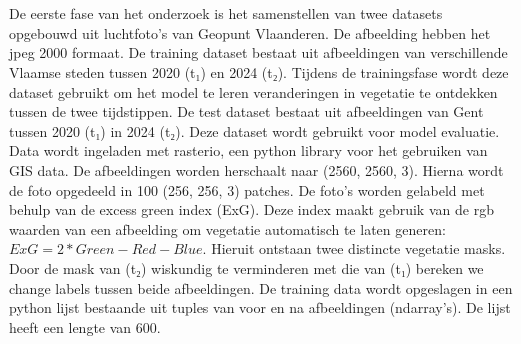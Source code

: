 \section{}%
\label{sec:image-preprocessing}
De eerste fase van het onderzoek is het samenstellen van twee datasets opgebouwd uit luchtfoto's van Geopunt Vlaanderen. De afbeelding hebben
het jpeg 2000 formaat. De training dataset bestaat uit afbeeldingen van verschillende Vlaamse steden tussen 2020 (t₁) en 2024 (t₂). 
Tijdens de trainingsfase wordt deze dataset gebruikt om het model te leren veranderingen in vegetatie te ontdekken tussen de twee tijdstippen.
De test dataset bestaat uit afbeeldingen van Gent tussen 2020 (t₁) in 2024 (t₂). Deze dataset wordt gebruikt voor model evaluatie.
\newline
Data wordt ingeladen met rasterio, een python library voor het gebruiken van GIS data. De afbeeldingen worden herschaalt naar (2560, 2560, 3).
Hierna wordt de foto opgedeeld in 100 (256, 256, 3) patches. De foto's worden gelabeld met behulp van de excess green index (ExG).
Deze index maakt gebruik van de rgb waarden van een afbeelding om vegetatie automatisch te laten generen: \(ExG = 2 * Green - Red - Blue \).
Hieruit ontstaan twee distincte vegetatie masks. Door de mask van (t₂) wiskundig te verminderen met die van (t₁) 
bereken we change labels tussen beide afbeeldingen. De training data wordt opgeslagen in een python lijst bestaande uit tuples van 
voor en na afbeeldingen (ndarray's). De lijst heeft een lengte van 600. 
\newline
